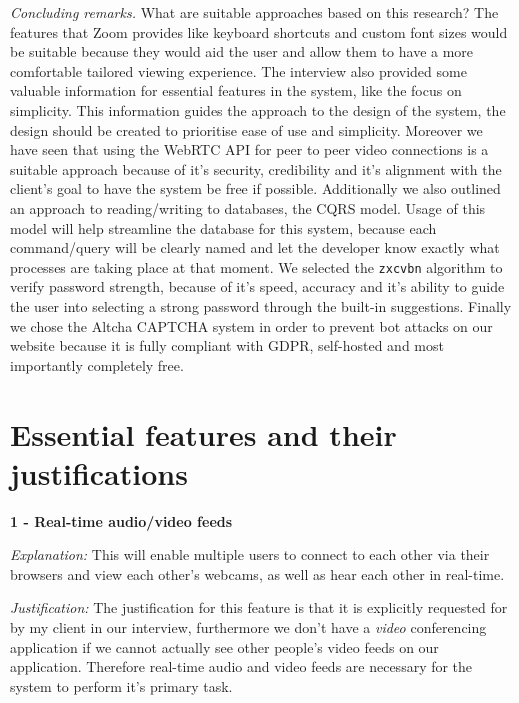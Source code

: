 \textit{Concluding remarks.}
What are suitable approaches based on this research?
The features that Zoom provides like keyboard shortcuts and
custom font sizes would be suitable because they would aid the
user and allow them to have a more comfortable tailored
viewing experience. The interview also provided some valuable
information for essential features in the system, like the
focus on simplicity. This information guides the approach to
the design of the system, the design should be created to
prioritise ease of use and simplicity. Moreover we have seen
that using the WebRTC API for peer to peer video connections
is a suitable approach because of it's security, credibility
and it's alignment with the client's goal to have the system
be free if possible. Additionally we also outlined an
approach to reading/writing to databases, the
CQRS model. Usage of this model will help streamline the
database for this system, because each command/query will be
clearly named and let the developer know exactly what
processes are taking place at that moment. We selected
the \texttt{zxcvbn} algorithm to verify password strength,
because of it's speed, accuracy and it's ability to guide the
user into selecting a strong password through the built-in
suggestions. Finally we chose the Altcha CAPTCHA system in
order to prevent bot attacks on our website because it is
fully compliant with GDPR, self-hosted and most importantly
completely free.

\section{Essential features and their justifications}
\label{sec:features}

\textsf{\bfseries 1 - Real-time audio/video feeds} \\ \vspace{0.1cm}

\textit{Explanation:} This will enable multiple users to
connect to each other via their browsers and view each
other's webcams, as well as hear
each other in real-time. \vspace{0.1cm}

\textit{Justification:} The justification for this feature is
that it is explicitly requested for by my client in our
interview, furthermore we don't have a \textit{video}
conferencing application if we cannot actually see other
people's video feeds on our application. Therefore real-time
audio and video feeds are necessary for the system to perform
it's primary task.

